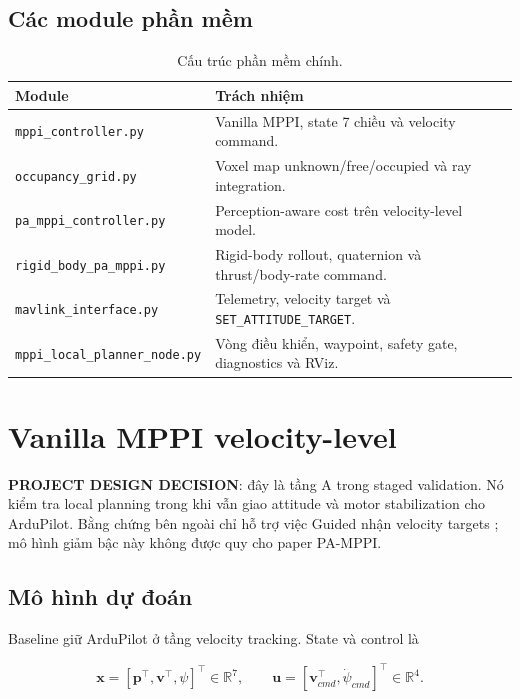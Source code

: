 \documentclass[11pt,a4paper]{article}
\newcommand{\code}[1]{\texttt{#1}}
\newcommand{\R}{\mathbb{R}}
\newcommand{\vect}[1]{\bm{#1}}
\begin{document}
\subsection{Các module phần mềm}

\begin{table}[ht]
\centering
\caption{Cấu trúc phần mềm chính.}
\begin{tabularx}{\textwidth}{L{0.34\textwidth}Y}
\toprule
\textbf{Module} & \textbf{Trách nhiệm} \\
\midrule
\code{mppi\_controller.py} & Vanilla MPPI, state 7 chiều và velocity command. \\
\code{occupancy\_grid.py} & Voxel map unknown/free/occupied và ray integration. \\
\code{pa\_mppi\_controller.py} & Perception-aware cost trên velocity-level model. \\
\code{rigid\_body\_pa\_mppi.py} & Rigid-body rollout, quaternion và thrust/body-rate command. \\
\code{mavlink\_interface.py} & Telemetry, velocity target và \code{SET\_ATTITUDE\_TARGET}. \\
\code{mppi\_local\_planner\_node.py} & Vòng điều khiển, waypoint, safety gate, diagnostics và RViz. \\
\bottomrule
\end{tabularx}
\end{table}

\section{Vanilla MPPI velocity-level}

\textbf{PROJECT DESIGN DECISION}: đây là tầng A trong staged validation. Nó
kiểm tra local planning trong khi vẫn giao attitude và motor stabilization cho
ArduPilot. Bằng chứng bên ngoài chỉ hỗ trợ việc Guided nhận velocity targets
\cite{ardupilotGuidedDocs2026,mavlinkCommon2026}; mô hình giảm bậc này không
được quy cho paper PA-MPPI.

\subsection{Mô hình dự đoán}

Baseline giữ ArduPilot ở tầng velocity tracking. State và control là

\begin{equation}
\vect x = [\vect p^\top,\vect v^\top,\psi]^\top \in \R^7,
\qquad
\vect u = [\vect v_{cmd}^\top,\dot\psi_{cmd}]^\top \in \R^4.
\end{equation}
\end{document}
